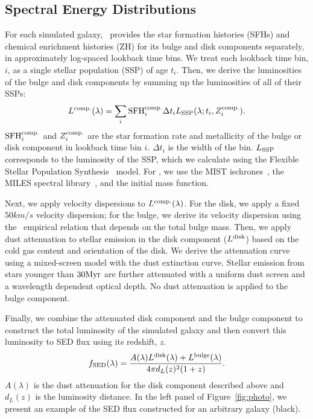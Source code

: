 \subsection{Spectral Energy Distributions} \label{sec:sed}
For each simulated galaxy, \lgal~provides the star formation histories (SFHs)
and chemical enrichment histories (ZH) for its bulge and disk components
separately, in approximately log-spaced lookback time bins. %
We treat each lookback time bin, $i$, as a single stellar population (SSP) of
age $t_i$.
Then, we derive the luminosities of the bulge and disk components by summing up
the luminosities of all of their SSPs:
\begin{equation}
    L^{\rm comp.}(\lambda) = \sum \limits_i {\rm SFH}^{\rm comp.}_i \Delta t_i L_{\rm
    SSP}(\lambda; t_i, Z^{\rm comp.}_i). 
\end{equation}
${\rm SFH}^{\rm comp.}_i$ and $Z^{\rm comp.}_i$ are the star formation rate and
metallicity of the bulge or disk component in lookback time bin $i$. 
$\Delta t_i$ is the width of the bin. 
$L_{\rm SSP}$ corresponds to the luminosity of the SSP, which we calculate
using the Flexible Stellar Population Synthesis~\citep[\fsps][]{conroy2009,
conroy2010c} model.
For \fsps, we use the MIST ischrones~\citep{paxton2011, paxton2013, paxton2015,
choi2016, dotter2016}, the MILES spectral library~\citep{sanchez_blazquez2006},
and the \cite{chabrier2003} initial mass function. 

Next, we apply velocity dispersions to $L^{\rm comp.}(\lambda)$.
For the disk, we apply a fixed $50 km/s$ velocity dispersion; for the bulge, we
derive its velocity dispersion using the~\cite{zahid2016} empirical relation
that depends on the total bulge mass.
Then, we apply dust attenuation to stellar emission in the disk component
($L^{\rm disk}$) based on the cold gas content and orientation of the disk. 
We derive the attenuation curve using a mixed-screen model with the
\cite{mathis1983} dust extinction curve. 
Stellar emission from stars younger than $30{\rm Myr}$ are further attenuated
with a uniform dust screen and a wavelength dependent optical depth.
No dust attenuation is applied to the bulge component.

Finally, we combine the attenuated disk component and the bulge component to
construct the total luminosity of the simulated galaxy and then convert this
luminosity to SED flux using its redshift, $z$.
\begin{equation}\label{eq:sed} 
    f_{\rm SED}(\lambda) = \frac{A(\lambda)L^{\rm disk}(\lambda) + L^{\rm bulge}(\lambda)}{4 \pi d_L(z)^2 (1+z)}.
\end{equation}
$A(\lambda)$ is the dust attenuation for the disk component described above 
and $d_L(z)$ is the luminosity distance.
In the left panel of Figure~\ref{fig:photo}, we present an example of the SED
flux constructed for an arbitrary \lgal galaxy (black).

